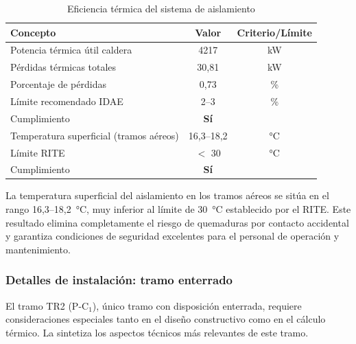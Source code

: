 \begin{table}[H]
	\centering
	\caption{Eficiencia térmica del sistema de aislamiento}
	\label{tab:conclusiones-eficiencia-aislamiento}
	\begin{tabular}{lcc}
		\toprule
		\textbf{Concepto}                       & \textbf{Valor} & \textbf{Criterio/Límite} \\
		\midrule
		Potencia térmica útil caldera           & 4217           & kW                       \\
		Pérdidas térmicas totales               & 30,81          & kW                       \\
		Porcentaje de pérdidas                  & 0,73           & \%                       \\
		\midrule
		Límite recomendado IDAE                 & 2--3           & \%                       \\
		Cumplimiento                            & \textbf{Sí}    & \checkmark               \\
		\midrule
		Temperatura superficial (tramos aéreos) & 16,3--18,2     & °C                       \\
		Límite RITE                             & $<$ 30         & °C                       \\
		Cumplimiento                            & \textbf{Sí}    & \checkmark               \\
		\bottomrule
	\end{tabular}
\end{table}

La temperatura superficial del aislamiento en los tramos aéreos se sitúa en el rango 16,3--18,2~°C, muy inferior al límite de 30~°C establecido por el RITE. Este resultado elimina completamente el riesgo de quemaduras por contacto accidental y garantiza condiciones de seguridad excelentes para el personal de operación y mantenimiento.

\subsubsection{Detalles de instalación: tramo enterrado}
\label{subsubsec:conclusiones-tramo-enterrado}

El tramo TR2 (P-C$_1$), único tramo con disposición enterrada, requiere consideraciones especiales tanto en el diseño constructivo como en el cálculo térmico. La  sintetiza los aspectos técnicos más relevantes de este tramo.

